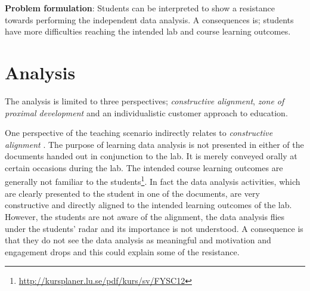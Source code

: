 \documentclass[]{article}
\begin{document}
{\bf Problem formulation}: Students can be interpreted to show a resistance towards performing the independent data analysis. A consequences is; students have more difficulties reaching the intended lab and course learning outcomes.


\section*{Analysis}
The analysis is limited to three perspectives; {\it constructive alignment}, {\it zone of proximal development} and an individualistic customer approach to education.

One perspective of the teaching scenario indirectly relates to {\it constructive alignment} \cite{biggs}.
The purpose of learning data analysis is not presented in either of the documents handed out in conjunction to the lab.
It is merely conveyed orally at certain occasions during the lab.
The intended course learning outcomes are generally not familiar to the students\footnote{\url{http://kursplaner.lu.se/pdf/kurs/sv/FYSC12}}.
In fact the data analysis activities, which are clearly presented to the student in one of the documents, are very constructive and directly aligned to the intended learning outcomes of the lab.
However, the students are not aware of the alignment, the data analysis flies under the students' radar and its importance is not understood.
A consequence is that they do not see the data analysis as meaningful and motivation and engagement drops \cite{saljo} and this could explain some of the resistance.
\end{document}
